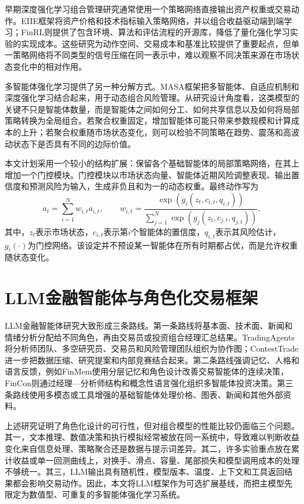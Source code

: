 \documentclass[10.5pt]{article}
\begin{document}
早期深度强化学习组合管理研究通常使用一个策略网络直接输出资产权重或交易动作。EIIE框架将资产价格和技术指标输入策略网络，并以组合收益驱动端到端学习\citep{JiangXuLiang2017}；FinRL则提供了包含环境、算法和评估流程的开源库，降低了量化强化学习实验的实现成本\citep{LiuYangChen2020}。这些研究为动作空间、交易成本和基准比较提供了重要起点，但单一策略网络将不同类型的信号压缩在同一表示中，难以观察不同决策来源在市场状态变化中的相对作用。

多智能体强化学习提供了另一种分解方式。MASA框架把多智能体、自适应机制和深度强化学习结合起来，用于动态组合风险管理\citep{LiTamYeung2024}。从研究设计角度看，这类模型的关键不只是智能体数量，而是智能体之间如何分工、如何共享信息以及如何将局部策略转换为全局组合。若聚合权重固定，增加智能体可能只带来参数规模和计算成本的上升；若聚合权重随市场状态变化，则可以检验不同策略在趋势、震荡和高波动状态下是否具有不同的边际价值。

本文计划采用一个较小的结构扩展：保留各个基础智能体的局部策略网络，在其上增加一个门控模块。门控模块以市场状态向量、智能体近期风险调整表现、输出置信度和预测风险为输入，生成非负且和为一的动态权重。最终动作写为
\begin{equation}
    a_t=\sum_{i=1}^{N} w_{i,t}a_{i,t},\qquad
    w_{i,t}=\frac{\exp(g_i(z_t,c_{i,t},q_{i,t}))}
    {\sum_{j=1}^{N}\exp(g_j(z_t,c_{j,t},q_{j,t}))},
\end{equation}
其中，$z_t$表示市场状态，$c_{i,t}$表示第$i$个智能体的置信度，$q_{i,t}$表示其风险估计，$g_i(\cdot)$为门控网络。该设定并不预设某一智能体在所有时期都占优，而是允许权重随状态变化。

\section{LLM金融智能体与角色化交易框架}

LLM金融智能体研究大致形成三条路线。第一条路线将基本面、技术面、新闻和情绪分析分配给不同角色，再由交易员或投资组合经理汇总结果。TradingAgents将分析师团队、多空研究员、交易员和风险管理团队组织为协作图\citep{XiaoSunLuo2024}；ContestTrade进一步把数据压缩、研究提案和内部竞赛结合起来\citep{ZhaoSunJiang2025}。第二条路线强调记忆、人格和语言反馈，例如FinMem使用分层记忆和角色设计改善交易智能体的连续决策\citep{YuLiChen2023}，FinCon则通过经理—分析师结构和概念性语言强化组织多智能体投资决策\citep{YuYaoLi2024}。第三条路线使用多模态或工具增强的基础智能体处理价格、图表、新闻和其他外部资料\citep{ZhangZhaoXia2024}。

上述研究证明了角色化设计的可行性，但对组合模型的性能比较仍面临三个问题。其一，文本推理、数值决策和执行模拟经常被放在同一系统中，导致难以判断收益变化来自信息处理、策略聚合还是数据与提示词差异。其二，许多实验重点放在累计收益或单一回测曲线上，对换手、滑点、容量、尾部损失和模型调用成本的处理不够统一。其三，LLM输出具有随机性，模型版本、温度、上下文和工具返回结果都会影响交易动作。因此，本文将LLM框架作为可选扩展基线，而把主模型先限定为数值型、可重复的多智能体强化学习系统。
\end{document}
